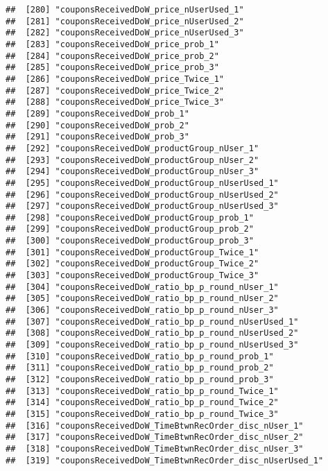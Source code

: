 \documentclass[10pt]{report}
\begin{document}
\begin{verbatim}
##  [280] "couponsReceivedDoW_price_nUserUsed_1"                 
##  [281] "couponsReceivedDoW_price_nUserUsed_2"                 
##  [282] "couponsReceivedDoW_price_nUserUsed_3"                 
##  [283] "couponsReceivedDoW_price_prob_1"                      
##  [284] "couponsReceivedDoW_price_prob_2"                      
##  [285] "couponsReceivedDoW_price_prob_3"                      
##  [286] "couponsReceivedDoW_price_Twice_1"                     
##  [287] "couponsReceivedDoW_price_Twice_2"                     
##  [288] "couponsReceivedDoW_price_Twice_3"                     
##  [289] "couponsReceivedDoW_prob_1"                            
##  [290] "couponsReceivedDoW_prob_2"                            
##  [291] "couponsReceivedDoW_prob_3"                            
##  [292] "couponsReceivedDoW_productGroup_nUser_1"              
##  [293] "couponsReceivedDoW_productGroup_nUser_2"              
##  [294] "couponsReceivedDoW_productGroup_nUser_3"              
##  [295] "couponsReceivedDoW_productGroup_nUserUsed_1"          
##  [296] "couponsReceivedDoW_productGroup_nUserUsed_2"          
##  [297] "couponsReceivedDoW_productGroup_nUserUsed_3"          
##  [298] "couponsReceivedDoW_productGroup_prob_1"               
##  [299] "couponsReceivedDoW_productGroup_prob_2"               
##  [300] "couponsReceivedDoW_productGroup_prob_3"               
##  [301] "couponsReceivedDoW_productGroup_Twice_1"              
##  [302] "couponsReceivedDoW_productGroup_Twice_2"              
##  [303] "couponsReceivedDoW_productGroup_Twice_3"              
##  [304] "couponsReceivedDoW_ratio_bp_p_round_nUser_1"          
##  [305] "couponsReceivedDoW_ratio_bp_p_round_nUser_2"          
##  [306] "couponsReceivedDoW_ratio_bp_p_round_nUser_3"          
##  [307] "couponsReceivedDoW_ratio_bp_p_round_nUserUsed_1"      
##  [308] "couponsReceivedDoW_ratio_bp_p_round_nUserUsed_2"      
##  [309] "couponsReceivedDoW_ratio_bp_p_round_nUserUsed_3"      
##  [310] "couponsReceivedDoW_ratio_bp_p_round_prob_1"           
##  [311] "couponsReceivedDoW_ratio_bp_p_round_prob_2"           
##  [312] "couponsReceivedDoW_ratio_bp_p_round_prob_3"           
##  [313] "couponsReceivedDoW_ratio_bp_p_round_Twice_1"          
##  [314] "couponsReceivedDoW_ratio_bp_p_round_Twice_2"          
##  [315] "couponsReceivedDoW_ratio_bp_p_round_Twice_3"          
##  [316] "couponsReceivedDoW_TimeBtwnRecOrder_disc_nUser_1"     
##  [317] "couponsReceivedDoW_TimeBtwnRecOrder_disc_nUser_2"     
##  [318] "couponsReceivedDoW_TimeBtwnRecOrder_disc_nUser_3"     
##  [319] "couponsReceivedDoW_TimeBtwnRecOrder_disc_nUserUsed_1" 

\end{verbatim}
\end{document}
